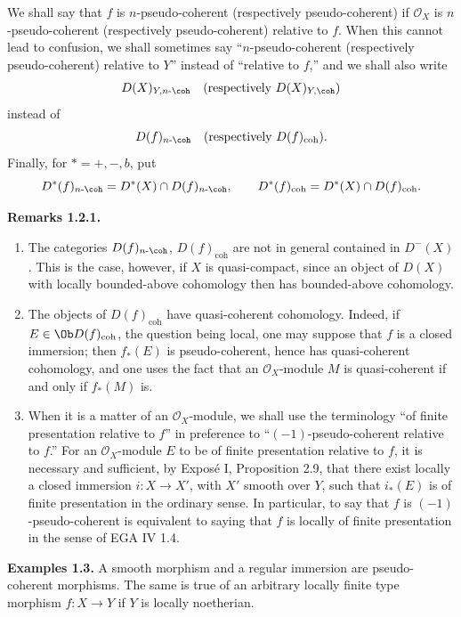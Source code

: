 \documentclass[11pt]{article}
\begin{document}
We shall say that \(f\) is \(n\)-pseudo-coherent (respectively pseudo-coherent) if \(\mathcal O_X\) is \(n\)-pseudo-coherent (respectively pseudo-coherent) relative to \(f\). When this cannot lead to confusion, we shall sometimes say ``\(n\)-pseudo-coherent (respectively pseudo-coherent) relative to \(Y\)'' instead of ``relative to \(f\),'' and we shall also write
\[
  D(X)_{Y,n\text{-}\coh}\quad(\text{respectively }D(X)_{Y,\coh})
\]
instead of
\[
  D(f)_{n\text{-}\coh}\quad(\text{respectively }D(f)_{\mathrm{coh}}).
\]
Finally, for \(*=+,-,b\), put
\[
  D^*(f)_{n\text{-}\coh}=D^*(X)\cap D(f)_{n\text{-}\coh},
  \qquad
  D^*(f)_{\mathrm{coh}}=D^*(X)\cap D(f)_{\mathrm{coh}}.
\]

\textbf{Remarks 1.2.1.}
\begin{enumerate}[label=\alph*)]
\item The categories \(D(f)_{n\text{-}\coh}\), \(D(f)_{\mathrm{coh}}\) are not in general contained in \(D^{-}(X)\). This is the case, however, if \(X\) is quasi-compact, since an object of \(D(X)\) with locally bounded-above cohomology then has bounded-above cohomology.

\item The objects of \(D(f)_{\mathrm{coh}}\) have quasi-coherent cohomology. Indeed, if \(E\in \Ob D(f)_{\mathrm{coh}}\), the question being local, one may suppose that \(f\) is a closed immersion; then \(f_*(E)\) is pseudo-coherent, hence has quasi-coherent cohomology, and one uses the fact that an \(\mathcal O_X\)-module \(M\) is quasi-coherent if and only if \(f_*(M)\) is.

\item When it is a matter of an \(\mathcal O_X\)-module, we shall use the terminology ``of finite presentation relative to \(f\)'' in preference to ``\((-1)\)-pseudo-coherent relative to \(f\).'' For an \(\mathcal O_X\)-module \(E\) to be of finite presentation relative to \(f\), it is necessary and sufficient, by Exposé I, Proposition 2.9, that there exist locally a closed immersion \(i:X\to X'\), with \(X'\) smooth over \(Y\), such that \(i_*(E)\) is of finite presentation in the ordinary sense. In particular, to say that \(f\) is \((-1)\)-pseudo-coherent is equivalent to saying that \(f\) is locally of finite presentation in the sense of EGA IV 1.4.
\end{enumerate}

\textbf{Examples 1.3.} A smooth morphism and a regular immersion are pseudo-coherent morphisms. The same is true of an arbitrary locally finite type morphism \(f:X\to Y\) if \(Y\) is locally noetherian.
\end{document}
